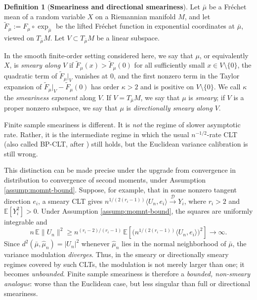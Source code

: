 \documentclass{amsart}
\theoremstyle{definition}
\newtheorem{definition}[theorem]{Definition}
\theoremstyle{remark}
\newcommand{\mubar}{\bar{\mu}}
\newcommand\0{\boldsymbol{0}}
\begin{document}
\begin{definition}[{\textbf{Smeariness and directional smeariness}}]
\label{def:smeariness-directional}
Let \(\mubar\) be a Fr\'echet mean of a random variable \(X\) on a Riemannian manifold \(M\), and let \(\widetilde{F}_\mu:=F_\mu \circ \exp_{\mubar}\) be the lifted Fr\'echet function in exponential coordinates at \(\mubar\), viewed on \(T_{\mubar}M\). Let \(V\subset T_{\mubar}M\) be a linear subspace.

In the smooth finite-order setting considered here, we say that \(\mu\), or equivalently \(X\), is \emph{smeary along \(V\)} if \(\widetilde{F}_\mu(x)>\widetilde{F}_\mu(0)\) for all sufficiently small \(x\in V\setminus\{0\}\), the quadratic term of \(\widetilde{F}_\mu|_V\) vanishes at \(0\), and the first nonzero term in the Taylor expansion of \(\widetilde{F}_\mu|_V-\widetilde{F}_\mu(0)\) has order \(\kappa>2\) and is positive on \(V\setminus\{0\}\). We call \(\kappa\) the\textit{ smeariness exponent }along \(V\). If \(V=T_{\mubar}M\), we say that \(\mu\) is \emph{smeary}; if \(V\) is a proper nonzero subspace, we say that \(\mu\) is \emph{directionally smeary along \(V\)}.
\end{definition}

Finite sample smeariness is different.  It is \textit{not} the regime of slower asymptotic rate.  Rather, it is the intermediate regime in which the usual \(n^{-1/2}\)-rate CLT (also called BP-CLT, after \citet{BhattacharyaPatrangenaru2003}) still holds, but the Euclidean variance calibration is still wrong.

This distinction can be made precise under the upgrade from convergence in distribution to convergence of second moments, under Assumption \ref{assump:momnt-bound}.  Suppose, for example, that in some nonzero tangent direction \(e_i\), a smeary CLT gives \(n^{1/(2(r_i-1))}\langle U_n,e_i\rangle \xrightarrow{\mathcal D} Y_i\), where \(r_i>2\) and \(\mathbb E[Y_i^2]>0\). Under Assumption \ref{assump:momnt-bound}, the squares are uniformly integrable and
\[
n\,\mathbb E\|U_n\|^2
\ge
n^{(r_i-2)/(r_i-1)}
\,\mathbb E\!\left[
\bigl(n^{1/(2(r_i-1))}\langle U_n,e_i\rangle\bigr)^2
\right]
\to\infty.
\]
Since \(d^2(\mubar,\hat\mu_n)=|U_n|^2\) whenever \(\hat\mu_n\) lies in the normal neighborhood of \(\mubar\), the variance modulation \textit{diverges}.  Thus, in the smeary or directionally smeary regimes covered by such CLTs, the modulation is not merely larger than one; it becomes\textit{ unbounded}.  Finite sample smeariness is therefore a \textit{bounded, non-smeary analogue}: worse than the Euclidean case, but less singular than full or directional smeariness.
\end{document}
